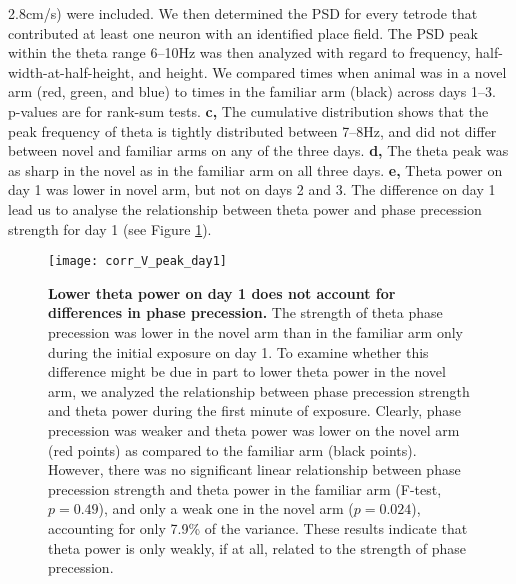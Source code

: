 \documentclass[preprint,rmp,preprintnumbers,floatfix]{revtex4}
\newcommand{\pval}[1]{$p= #1$}
\begin{document}
\begin{figure*}[htbp]
{    2.8cm/s) were included.  We then determined the PSD for every tetrode that
    contributed at least one neuron with an identified place field. The PSD peak
    within the theta range 6--10Hz was then analyzed with regard to frequency,
    half-width-at-half-height, and height.  We compared times when animal was in
    a novel arm (red, green, and blue) to times in the familiar arm (black)
    across days 1--3. p-values are for rank-sum tests. 
    {\bf c,} The cumulative distribution shows that the peak frequency of theta
    is tightly distributed between 7--8Hz, and did not differ between novel and
    familiar arms on any of the three days. 
    {\bf d,} The theta peak was as sharp in the novel as in the
    familiar arm on all three days.  
    {\bf e,} Theta power on day 1 was lower in novel arm, but not on days 2 and
    3.  The difference on day 1 lead us to analyse
    the relationship between theta power and phase precession strength for day 1
    (see Figure \ref{fig:corr_V_peak}).
    }
\end{figure*}

\clearpage %
\begin{figure}[htbp]
    \centering
    \texttt{[image: corr\_V\_peak\_day1]}
    \caption{{\bf  Lower theta power on day 1 does not account for differences in phase precession.  }
    The strength of theta phase precession was lower in the novel arm than in
    the familiar arm only during the initial exposure on day 1. To examine
    whether this difference might be due in part to lower theta power in the
    novel arm, we analyzed the relationship between phase precession strength
    and theta power during the first minute of exposure. Clearly, phase
    precession was weaker and theta power was lower on the novel arm (red
    points) as compared to the familiar arm (black points). However, there was
    no significant linear relationship between phase precession strength and
    theta power in the familiar arm (F-test, \pval{0.49}), and only a weak one in
    the novel arm (\pval{0.024}), accounting for only 7.9\% of the variance. These
    results indicate that theta power is only weakly, if at all, related to the
    strength of phase precession. 
    \label{fig:corr_V_peak} }
\end{figure}
\end{document}
